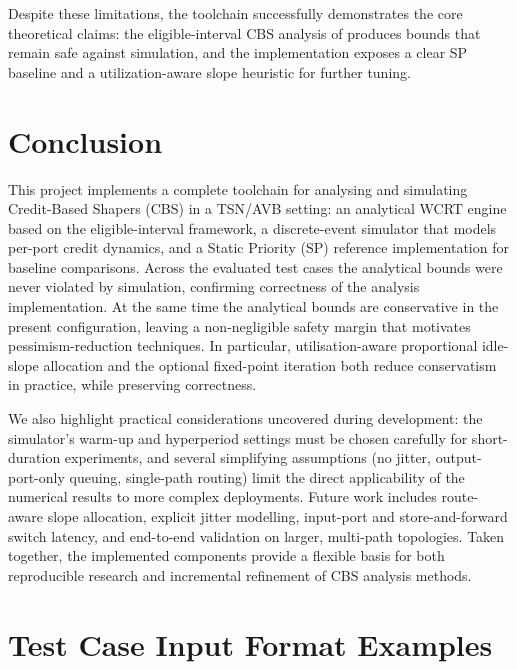 \documentclass[11pt,a4paper]{article}
\begin{document}
Despite these limitations, the toolchain successfully demonstrates the core
theoretical claims: the eligible-interval CBS analysis of \cite{Cao2016,Cao2018}
produces bounds that remain safe against simulation, and the implementation
exposes a clear SP baseline and a utilization-aware slope heuristic for
further tuning.

\section{Conclusion}

This project implements a complete toolchain for analysing and simulating
Credit-Based Shapers (CBS) in a TSN/AVB setting: an analytical WCRT engine
based on the eligible-interval framework, a discrete-event simulator that
models per-port credit dynamics, and a Static Priority (SP) reference
implementation for baseline comparisons. Across the evaluated test cases the
analytical bounds were never violated by simulation, confirming correctness
of the analysis implementation. At the same time the analytical bounds are
conservative in the present configuration, leaving a non-negligible safety
margin that motivates pessimism-reduction techniques. In particular,
utilisation-aware proportional idle-slope allocation and the optional
fixed-point iteration both reduce conservatism in practice, while preserving
correctness.

We also highlight practical considerations uncovered during development:
the simulator's warm-up and hyperperiod settings must be chosen carefully for
short-duration experiments, and several simplifying assumptions (no jitter,
output-port-only queuing, single-path routing) limit the direct applicability
of the numerical results to more complex deployments. Future work includes
route-aware slope allocation, explicit jitter modelling, input-port and
store-and-forward switch latency, and end-to-end validation on larger,
multi-path topologies. Taken together, the implemented components provide a
flexible basis for both reproducible research and incremental refinement of
CBS analysis methods.

\appendix
\section{Test Case Input Format Examples}
\label{app:formats}
\end{document}
